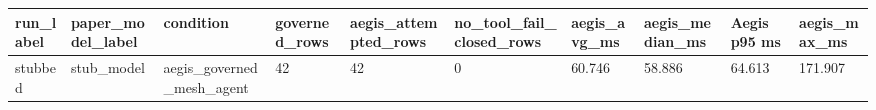 \begin{tabular}{llllllllll}
 \hline
run\_label & paper\_model\_label & condition & governed\_rows & aegis\_attempted\_rows & no\_tool\_fail\_closed\_rows & aegis\_avg\_ms & aegis\_median\_ms & Aegis p95 ms & aegis\_max\_ms \\
 \hline
stubbed & stub\_model & aegis\_governed\_mesh\_agent & 42 & 42 & 0 & 60.746 & 58.886 & 64.613 & 171.907 \\
 \hline
\end{tabular}

